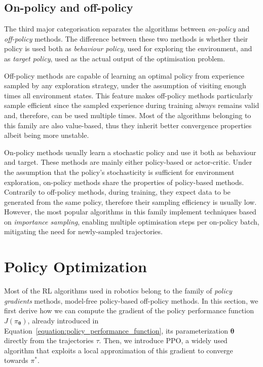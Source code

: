 \subsection{On-policy and off-policy}

The third major categorisation separates the algorithms between \emph{on-policy} and \emph{off-policy} methods.
The difference between these two methods is whether their policy is used both as \emph{behaviour policy}, used for exploring the environment, and as \emph{target policy}, used as the actual output of the optimisation problem.

Off-policy methods are capable of learning an optimal policy from experience sampled by any exploration strategy, under the assumption of visiting enough times all environment states.
This feature makes off-policy methods particularly sample efficient since the sampled experience during training always remains valid and, therefore, can be used multiple times.
Most of the algorithms belonging to this family are also value-based, thus they inherit better convergence properties albeit being more unstable.

On-policy methods usually learn a stochastic policy and use it both as behaviour and target.
These methods are mainly either policy-based or actor-critic.
Under the assumption that the policy's stochasticity is sufficient for environment exploration, on-policy methods share the properties of policy-based methods.
Contrarily to off-policy methods, during training, they expect data to be generated from the same policy, therefore their sampling efficiency is usually low.
However, the most popular algorithms in this family implement techniques based on \emph{importance sampling}, enabling multiple optimisation steps per on-policy batch, mitigating the need for newly-sampled trajectories.

\section{Policy Optimization}

Most of the \acl{RL} algorithms used in robotics belong to the family of \emph{policy gradients} methods, \ie model-free policy-based off-policy methods.
In this section, we first derive how we can compute the gradient of the policy performance function $J(\pi_{\boldsymbol{\theta}})$, already introduced in Equation~\eqref{equation:policy_performance_function}, \wrt its parameterization $\boldsymbol{\theta}$ directly from the trajectories $\tau$.
Then, we introduce \acl{PPO}, a widely used algorithm that exploits a local approximation of this gradient to converge towards $\pi^*$.

